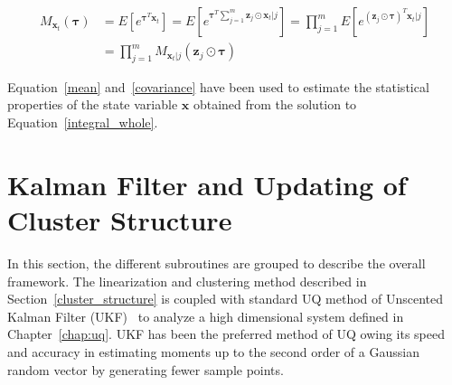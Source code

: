 \begin{equation}
\begin{array}{ll}
M_{\textbf{x}_t}(\bm{\tau}) &=  E \left[ e^{\bm{\tau}^T \textbf{x}_t} \right] =  E \left[ e^{\bm{\tau}^T \sum_{j=1}^m  \textbf{z}_j \odot \textbf{x}_t|j }  \right] = \displaystyle \prod_{j=1}^m E \left[e^{(\textbf{z}_j \odot \bm{\tau} )^T \textbf{x}_{t}|j }  \right] \\
&= \displaystyle \prod_{j=1}^m M_{\textbf{x}_t|j} (\textbf{z}_j \odot \bm{\tau})
\end{array}
\end{equation}

Equation~\ref{mean} and~\ref{covariance} have been used to estimate the statistical properties of the state variable $\textbf{x}$ obtained from the solution to Equation~\ref{integral_whole}. 

\section{Kalman Filter and Updating of Cluster Structure}
\label{ukf_clust}
In this section, the different subroutines are grouped to describe the overall framework. The linearization and clustering method described in Section~\ref{cluster_structure} is coupled with standard UQ method of Unscented Kalman Filter (UKF)~\cite{julier1997new} to analyze a high dimensional system defined in Chapter~\ref{chap:uq}. UKF has been the preferred method of UQ owing its speed and accuracy in estimating moments up to the second order of a Gaussian random vector by generating fewer sample points. 


